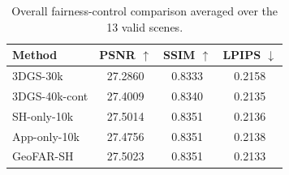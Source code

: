 ﻿\begin{table}[t]
\centering
\caption{Overall fairness-control comparison averaged over the 13 valid scenes.}
\label{tab:overall_fairness_control}
\begin{tabular}{lccc}
\hline
Method & PSNR $\uparrow$ & SSIM $\uparrow$ & LPIPS $\downarrow$ \\
\hline
3DGS-30k & 27.2860 & 0.8333 & 0.2158 \\
3DGS-40k-cont & 27.4009 & 0.8340 & 0.2135 \\
SH-only-10k & 27.5014 & 0.8351 & 0.2136 \\
App-only-10k & 27.4756 & 0.8351 & 0.2138 \\
GeoFAR-SH & 27.5023 & 0.8351 & 0.2133 \\
\hline
\end{tabular}
\end{table}




